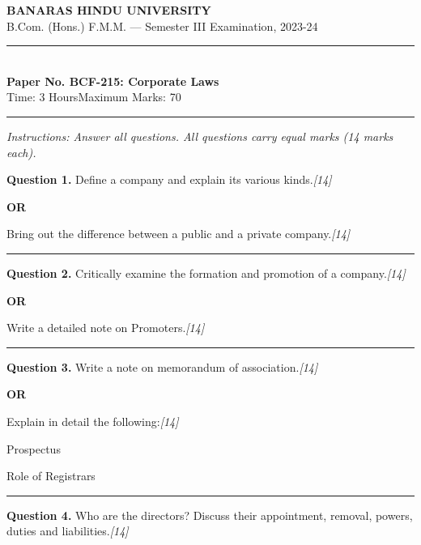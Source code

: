 \documentclass[11pt,a4paper]{article}
\newcommand{\pts}[1]{\hfill   \textit{[#1]}}
\begin{document}
\begin{center}
  {\large\bfseries BANARAS HINDU UNIVERSITY}\\[2pt]
  {\normalsize B.Com. (Hons.) F.M.M. --- Semester III Examination, 2023-24}\\[6pt]
  \rule{0.8\linewidth}{0.5pt}\\[6pt]
  {\large\bfseries Paper No. BCF-215: Corporate Laws}\\[4pt]
  {\normalsize Time: 3 Hours\hfill Maximum Marks: 70}
\end{center}

\rule{\linewidth}{0.4pt}

\smallskip



\noindent   \textit{Instructions: Answer all questions. All questions carry equal marks (14 marks each).}

\bigskip




\noindent   \textbf{Question 1.}
Define a company and explain its various kinds.\pts{14}

\centerline{   \textbf{OR}}

Bring out the difference between a public and a private company.\pts{14}

\medskip\rule{\linewidth}{0.2pt}




\noindent   \textbf{Question 2.}
Critically examine the formation and promotion of a company.\pts{14}

\centerline{   \textbf{OR}}

Write a detailed note on Promoters.\pts{14}

\medskip\rule{\linewidth}{0.2pt}




\noindent   \textbf{Question 3.}
Write a note on memorandum of association.\pts{14}

\centerline{   \textbf{OR}}

Explain in detail the following:\pts{14}

\begin{parts}
  \item Prospectus
  \item Role of Registrars
\end{parts}

\medskip\rule{\linewidth}{0.2pt}




\noindent   \textbf{Question 4.}
Who are the directors? Discuss their appointment, removal, powers, duties and liabilities.\pts{14}
\end{document}
